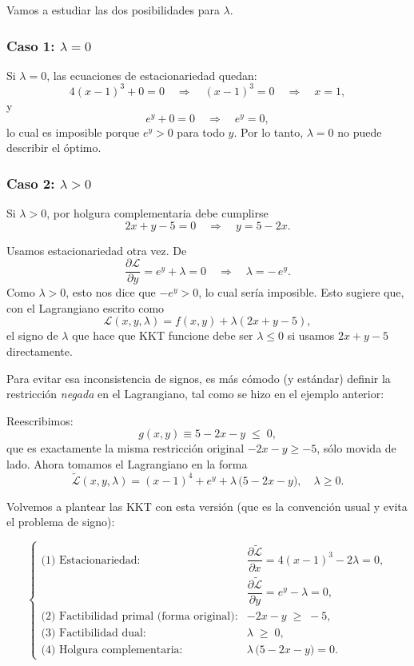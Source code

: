 \documentclass{article}
\begin{document}
Vamos a estudiar las dos posibilidades para \(\lambda\).

\subsubsection*{Caso 1: \(\lambda = 0\)}

Si \(\lambda = 0\), las ecuaciones de estacionariedad quedan:
\[
4(x-1)^3 + 0 = 0 
\quad\Longrightarrow\quad
(x-1)^3 = 0
\quad\Longrightarrow\quad
x = 1,
\]
y
\[
e^{y} + 0 = 0
\quad\Longrightarrow\quad
e^{y} = 0,
\]
lo cual es imposible porque \(e^{y} > 0\) para todo \(y\).  
Por lo tanto, \(\lambda=0\) no puede describir el óptimo.

\subsubsection*{Caso 2: \(\lambda > 0\)}

Si \(\lambda>0\), por holgura complementaria debe cumplirse
\[
2x + y - 5 = 0
\quad\Longrightarrow\quad
y = 5 - 2x.
\]

Usamos estacionariedad otra vez.  
De
\[
\dfrac{\partial \mathcal{L}}{\partial y} = e^{y} + \lambda = 0
\quad\Longrightarrow\quad
\lambda = -\,e^{y}.
\]
Como \(\lambda>0\), esto nos dice que \(-e^{y} > 0\), lo cual sería imposible.  
Esto sugiere que, con el Lagrangiano escrito como
\[
\mathcal{L}(x,y,\lambda)
= f(x,y)+\lambda(2x+y-5),
\]
el signo de \(\lambda\) que hace que KKT funcione debe ser \(\lambda \le 0\) si usamos \(2x+y-5\) directamente.

Para evitar esa inconsistencia de signos, es más cómodo (y estándar) definir la restricción \emph{negada} en el Lagrangiano, tal como se hizo en el ejemplo anterior:

Reescribimos:
\[
g(x,y) \equiv 5 - 2x - y \;\le\;0,
\]
que es exactamente la misma restricción original \(-2x-y\ge-5\), sólo movida de lado.  
Ahora tomamos el Lagrangiano en la forma
\[
\widetilde{\mathcal{L}}(x,y,\lambda)
= (x-1)^4 + e^{y}
+ \lambda\,\bigl(5 - 2x - y\bigr),
\quad \lambda \ge 0.
\]

Volvemos a plantear las KKT con esta versión (que es la convención usual y evita el problema de signo):

\[
\begin{cases}
\text{(1) Estacionariedad:} &
\dfrac{\partial \widetilde{\mathcal{L}}}{\partial x}
=4(x-1)^3 - 2\lambda
=0,
\\[8pt]
&
\dfrac{\partial \widetilde{\mathcal{L}}}{\partial y}
=e^{y} - \lambda
=0,
\\[10pt]
\text{(2) Factibilidad primal (forma original):} &
-2x - y \;\ge\; -5,
\\[6pt]
\text{(3) Factibilidad dual:} &
\lambda \;\ge\; 0,
\\[6pt]
\text{(4) Holgura complementaria:} &
\lambda\,\bigl(5 - 2x - y\bigr)=0.
\end{cases}
\]
\end{document}
